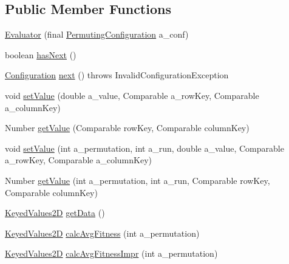 \subsection*{Public Member Functions}
\begin{DoxyCompactItemize}
\item 
\hyperlink{classorg_1_1jgap_1_1audit_1_1_evaluator_a81edfe668ff07b19b1e5bd8d034d4056}{Evaluator} (final \hyperlink{classorg_1_1jgap_1_1audit_1_1_permuting_configuration}{Permuting\-Configuration} a\-\_\-conf)
\item 
boolean \hyperlink{classorg_1_1jgap_1_1audit_1_1_evaluator_ad8cafe98e1b94dff9a556fdd455b49d2}{has\-Next} ()
\item 
\hyperlink{classorg_1_1jgap_1_1_configuration}{Configuration} \hyperlink{classorg_1_1jgap_1_1audit_1_1_evaluator_a2576280461955eb41abffc0e56491608}{next} ()  throws Invalid\-Configuration\-Exception 
\item 
void \hyperlink{classorg_1_1jgap_1_1audit_1_1_evaluator_a06ec484afd450635db73cf803ee4334c}{set\-Value} (double a\-\_\-value, Comparable a\-\_\-row\-Key, Comparable a\-\_\-column\-Key)
\item 
Number \hyperlink{classorg_1_1jgap_1_1audit_1_1_evaluator_a89b956f95eb37137ca2b5f12a1d5402d}{get\-Value} (Comparable row\-Key, Comparable column\-Key)
\item 
void \hyperlink{classorg_1_1jgap_1_1audit_1_1_evaluator_ab0b472080690febf2bbf4d537f20cb72}{set\-Value} (int a\-\_\-permutation, int a\-\_\-run, double a\-\_\-value, Comparable a\-\_\-row\-Key, Comparable a\-\_\-column\-Key)
\item 
Number \hyperlink{classorg_1_1jgap_1_1audit_1_1_evaluator_a4e5098189bebb031f0a49eed915ed2e4}{get\-Value} (int a\-\_\-permutation, int a\-\_\-run, Comparable row\-Key, Comparable column\-Key)
\item 
\hyperlink{classorg_1_1jgap_1_1audit_1_1_keyed_values2_d}{Keyed\-Values2\-D} \hyperlink{classorg_1_1jgap_1_1audit_1_1_evaluator_afd40b95d423944b71ec75f14d61baf39}{get\-Data} ()
\item 
\hyperlink{classorg_1_1jgap_1_1audit_1_1_keyed_values2_d}{Keyed\-Values2\-D} \hyperlink{classorg_1_1jgap_1_1audit_1_1_evaluator_a383bb97616629ca05ef5c3164dd8de0a}{calc\-Avg\-Fitness} (int a\-\_\-permutation)
\item 
\hyperlink{classorg_1_1jgap_1_1audit_1_1_keyed_values2_d}{Keyed\-Values2\-D} \hyperlink{classorg_1_1jgap_1_1audit_1_1_evaluator_a68331d6b5db79708b87b72d5077a0e5e}{calc\-Avg\-Fitness\-Impr} (int a\-\_\-permutation)

\end{DoxyCompactItemize}
